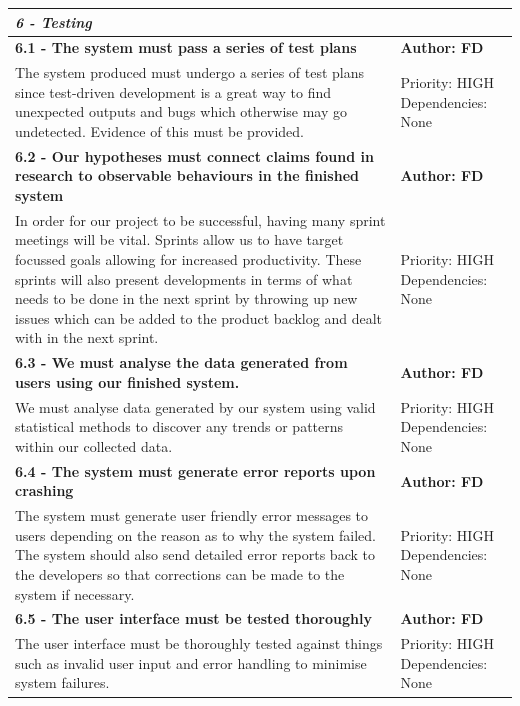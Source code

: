 \documentclass[11pt]{report}
\begin{document}
\begin{center}
\begin{longtable}{| p{13cm} | p{3cm} |}
\multicolumn{2}{|l|}{\textbf{\textit{6 - Testing}}} \\
\hline
\textbf{6.1 - The system must pass a series of test plans} & \textbf{Author: FD} \\
\hline
The system produced must undergo a series of test plans since test-driven development is a great way to find unexpected outputs and bugs which otherwise may go undetected. Evidence of this must be provided.&Priority: HIGH Dependencies: None\\
\hline
\textbf{6.2 - Our hypotheses must connect claims found in research to observable behaviours in the finished system} & \textbf{Author: FD} \\
\hline
In order for our project to be successful, having many sprint meetings will be vital. Sprints allow us to have target focussed goals allowing for increased productivity. These sprints will also present developments in terms of what needs to be done in the next sprint by throwing up new issues which can be added to the product backlog and dealt with in the next sprint.&Priority: HIGH Dependencies: None\\
\hline
\textbf{6.3 - We must analyse the data generated from users using our finished system.} & \textbf{Author: FD} \\
\hline
We must analyse data generated by our system using valid statistical methods to discover any trends or patterns within our collected data.&Priority: HIGH Dependencies: None\\
\hline
\textbf{6.4 - The system must generate error reports upon crashing} & \textbf{Author: FD} \\
\hline
The system must generate user friendly error messages to users depending on the reason as to why the system failed. The system should also send detailed error reports back to the developers so that corrections can be made to the system if necessary.&Priority: HIGH Dependencies: None\\
\hline
\textbf{6.5 - The user interface must be tested thoroughly} & \textbf{Author: FD} \\
\hline
The user interface must be thoroughly tested against things such as invalid user input and error handling to minimise system failures.&Priority: HIGH Dependencies: None\\
\hline
\end{longtable}

\end{center}
\end{document}
